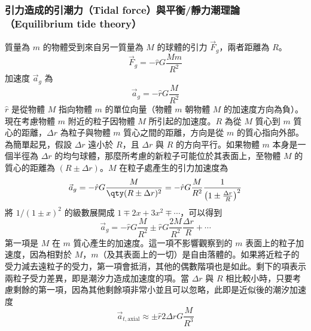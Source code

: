 \documentclass[a4paper,12pt]{report}
\begin{document}
\subsubsection{引力造成的引潮力（Tidal force）與平衡/靜力潮理論（Equilibrium tide theory）}
質量為 $m$ 的物體受到來自另一質量為 $M$ 的球體的引力 $\vec{F}_g$，兩者距離為 $R$。
\[
\vec{F}_g = - \hat{r}G\frac{M m}{R^2}
\]
加速度 $\vec{a}_g$ 為
\[
\vec{a}_g = - \hat{r}G\frac{M}{R^2}
\]
$\hat{r}$ 是從物體 $M$ 指向物體 $m$ 的單位向量（物體 $m$ 朝物體 $M$ 的加速度方向為負）。\\
現在考慮物體 $m$ 附近的粒子因物體 $M$ 所引起的加速度。$R$ 為從 $M$ 質心到 $m$ 質心的距離，$\Delta r$ 為粒子與物體 $m$ 質心之間的距離，方向是從 $m$ 的質心指向外部。為簡單起見，假設 $\Delta r$ 遠小於 $R$，且 $\Delta r$ 與 $R$ 的方向平行。如果物體 $m$ 本身是一個半徑為 $\Delta r$ 的均勻球體，那麼所考慮的新粒子可能位於其表面上，至物體 $M$ 的質心的距離為 $(R \pm \Delta r)$。$M$ 在粒子處產生的引力加速度為
\[
\vec{a}_g = - \hat{r}G\frac{M}{\qty(R \pm \Delta r)^2} = -\hat{r} G \frac{M}{R^2} \frac{1}{\left(1 \pm \frac{\Delta r}{R}\right)^2}
\]
將 $1/(1 \pm x)^2$ 的級數展開成 $1 \mp 2x + 3x^2 \mp \cdots$，可以得到
\[
\vec{a}_g = - \hat{r} G \frac{M}{R^2} \pm \hat{r} G \frac{2 M }{R^2} \frac{\Delta r}{R} + \cdots
\]
第一項是 $M$ 在 $m$ 質心產生的加速度。這一項不影響觀察到的 $m$ 表面上的粒子加速度，因為相對於 $M$，$m$（及其表面上的一切）是自由落體的。如果將近粒子的受力減去遠粒子的受力，第一項會抵消，其他的偶數階項也是如此。剩下的項表示兩粒子受力差異，即是潮汐力造成加速度的項。當 $\Delta r$ 與 $R$ 相比較小時，只要考慮剩餘的第一項，因為其他剩餘項非常小並且可以忽略，此即是近似後的潮汐加速度
\[
\vec{a}_{t,\text{axial}} \approx \pm \hat{r} 2 \Delta r  G  \frac{M}{R^3}
\]
\end{document}
